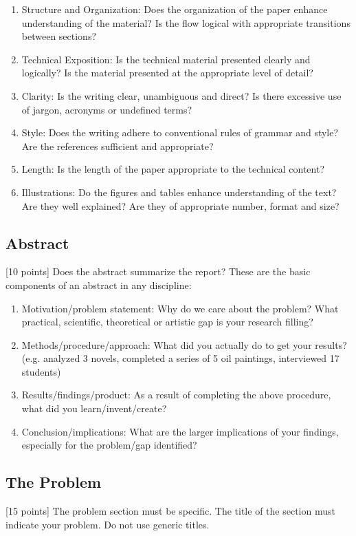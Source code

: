 \documentclass{winslabreport}
\begin{document}
\begin{enumerate}
    \item Structure and Organization: Does the organization of the paper enhance understanding of the material? Is the flow logical with appropriate transitions between sections?
    \item Technical Exposition: Is the technical material presented clearly and logically? Is the material presented at the appropriate level of detail?
    \item  Clarity: Is the writing clear, unambiguous and direct? Is there excessive use of jargon, acronyms or undefined terms?
    \item Style: Does the writing adhere to conventional rules of grammar and style? Are the references sufficient and appropriate?
    \item Length: Is the length of the paper appropriate to the technical content?
    \item Illustrations: Do the figures and tables enhance understanding of the text? Are they well explained? Are they of appropriate number, format and size?
\end{enumerate}


\subsection{Abstract}
[10 points] Does the abstract summarize the report? These are the basic components of an abstract in any discipline:

\begin{enumerate}
    \item Motivation/problem statement: Why do we care about the problem? What practical, scientific, theoretical or artistic gap is your research filling?
    \item  Methods/procedure/approach: What did you actually do to get your results? (e.g. analyzed 3 novels, completed a series of 5 oil paintings, interviewed 17 students)
    \item Results/findings/product: As a result of completing the above procedure, what did you learn/invent/create?
    \item Conclusion/implications: What are the larger implications of your findings, especially for the problem/gap identified?
\end{enumerate}

\subsection{The Problem}
[15 points] The problem section must be specific. The title of the section must indicate your problem. Do not use generic titles.
\end{document}
